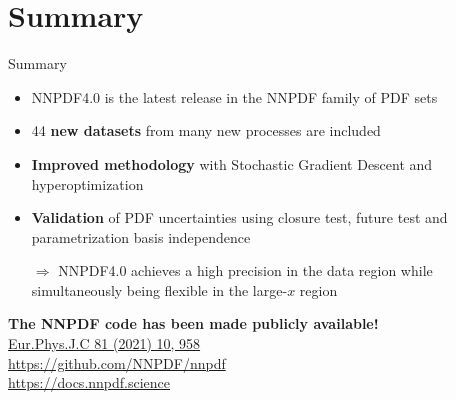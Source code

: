 \documentclass[aspectratio=169,9pt]{beamer}
\begin{document}
\section{Summary}
\begin{frame}[t]{Summary}
    \begin{itemize}
        \item NNPDF4.0 is the latest release in the NNPDF family of PDF sets
        \item 44 {\bfseries new datasets} from many new processes are included
        \item {\bfseries Improved methodology} with Stochastic Gradient Descent and hyperoptimization
        \item {\bfseries Validation} of PDF uncertainties using closure test, future test and parametrization basis independence
        \item[$\Rightarrow$] NNPDF4.0 achieves a high precision in the data region while simultaneously being flexible in the large-$x$ region
    \end{itemize}
	\vspace*{1em}
    \begin{block}{}
        \centering
        \textbf{The NNPDF code has been made publicly available!}\\
		\href{https://link.springer.com/article/10.1140/epjc/s10052-021-09747-9}{Eur.Phys.J.C 81 (2021) 10, 958} \\
		\url{https://github.com/NNPDF/nnpdf} \\
		\url{https://docs.nnpdf.science}
    \end{block}

    \vspace*{1em}
\end{frame}



\end{document}

